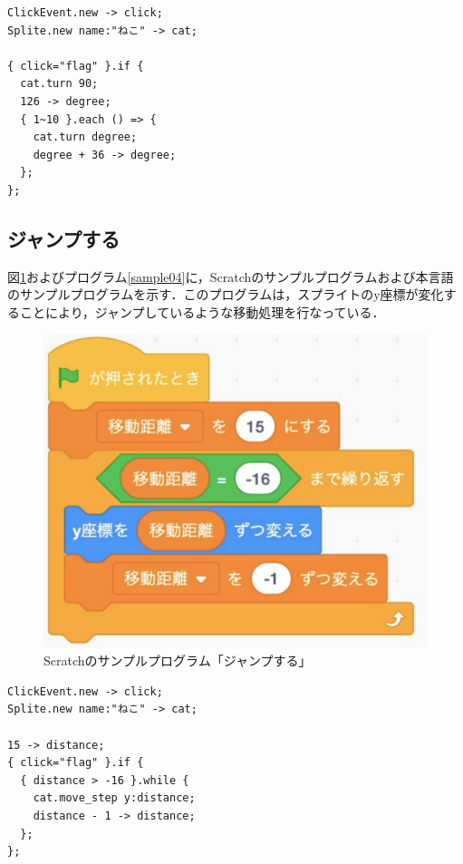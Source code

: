 \documentclass[10pt,a4j]{ltjsarticle}
\begin{document}
\begin{lstlisting}[caption=本言語のサンプルプログラム「回転する」, label=sample06]
ClickEvent.new -> click;
Splite.new name:"ねこ" -> cat;

{ click="flag" }.if { 
  cat.turn 90;
  126 -> degree;
  { 1~10 }.each () => {
    cat.turn degree;
    degree + 36 -> degree;
  };
};
\end{lstlisting}

\subsection{ジャンプする}
図\ref{fig:sample04}およびプログラム\ref{sample04}に，Scratchのサンプルプログラムおよび本言語のサンプルプログラムを示す．このプログラムは，スプライトのy座標が変化することにより，ジャンプしているような移動処理を行なっている．

\begin{figure}[H]
  \centering
  \includegraphics[scale=0.3]{images/sample04.pdf}
  \caption{Scratchのサンプルプログラム「ジャンプする」}
  \label{fig:sample04}
\end{figure}

\begin{lstlisting}[caption=本言語のサンプルプログラム「ジャンプする」, label=sample04]
ClickEvent.new -> click;
Splite.new name:"ねこ" -> cat;

15 -> distance;
{ click="flag" }.if { 
  { distance > -16 }.while {
    cat.move_step y:distance;
    distance - 1 -> distance;
  };
};
\end{lstlisting}
\end{document}
